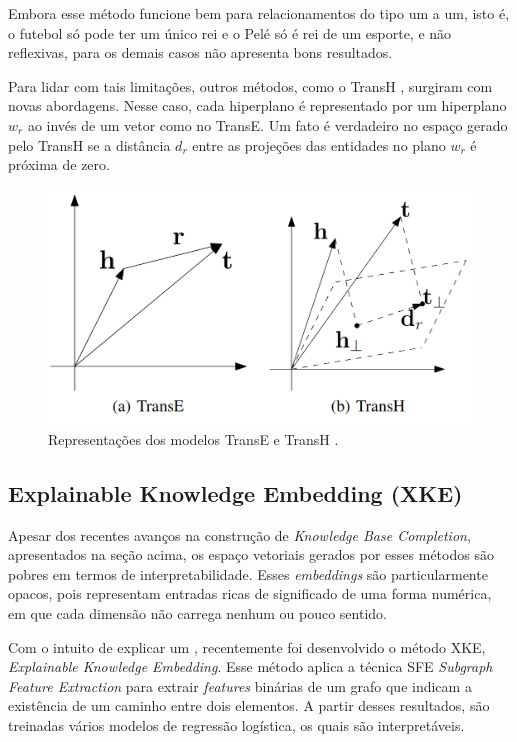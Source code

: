 \documentclass[]{politex}
\begin{document}
Embora esse método funcione bem para relacionamentos do tipo um a um, isto é, o futebol só pode ter um único rei e o Pelé só é rei de um esporte, e não reflexivas, para os demais casos não apresenta bons resultados.

Para lidar com tais limitações, outros métodos, como o TransH \cite{Wang2014KnowledgeGE}, surgiram com novas abordagens. Nesse caso, cada hiperplano é representado por um hiperplano $w_{r}$ ao invés de um vetor como no TransE. Um fato é verdadeiro no espaço gerado pelo TransH se a distância $d_{r}$ entre as projeções das entidades no plano $w_{r}$ é próxima de zero.
 
\begin{figure}[h]
    \centering
    \includegraphics[scale=0.4]{images/TransE-TransH.png}
    \caption{Representações dos modelos TransE e TransH \cite{Wang2014KnowledgeGE}.}
    \label{fig:trasnE_transH}
\end{figure}

\subsection{Explainable Knowledge Embedding (XKE)}

Apesar dos recentes avanços na construção de \textit{Knowledge Base Completion}, apresentados na seção acima, os espaço vetoriais gerados por esses métodos são pobres em termos de interpretabilidade. Esses \textit{embeddings} são particularmente opacos, pois representam entradas ricas de significado de uma forma numérica, em que cada dimensão não carrega nenhum ou pouco sentido. 

Com o intuito de explicar um , recentemente foi desenvolvido o método XKE, \textit{Explainable Knowledge Embedding}. Esse método aplica a técnica SFE \textit{Subgraph Feature Extraction} \cite{Gardner-et-al2015} para extrair \textit{features} binárias de um grafo que indicam a existência de um caminho entre dois elementos. A partir desses resultados, são treinadas vários modelos de regressão logística, os quais são interpretáveis.
\end{document}
